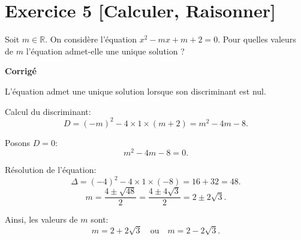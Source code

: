 \documentclass{article}
\begin{document}
\section*{Exercice 5 \textbf{[Calculer, Raisonner]}}

Soit $m \in \mathbb{R}$. On considère l'équation $x^2 - mx + m + 2 = 0$. Pour quelles valeurs de $m$ l'équation admet-elle une unique solution ?

\textbf{Corrigé}

L'équation admet une unique solution lorsque son discriminant est nul.

Calcul du discriminant:
\[
D = (-m)^2 - 4 \times 1 \times (m + 2) = m^2 - 4m - 8.
\]

Posons $D = 0$:
\[
m^2 - 4m - 8 = 0.
\]

Résolution de l'équation:
\[
\Delta = (-4)^2 - 4 \times 1 \times (-8) = 16 + 32 = 48.
\]
\[
m = \dfrac{4 \pm \sqrt{48}}{2} = \dfrac{4 \pm 4\sqrt{3}}{2} = 2 \pm 2\sqrt{3}.
\]

Ainsi, les valeurs de $m$ sont:
\[
m = 2 + 2\sqrt{3} \quad \text{ou} \quad m = 2 - 2\sqrt{3}.
\]
\end{document}
